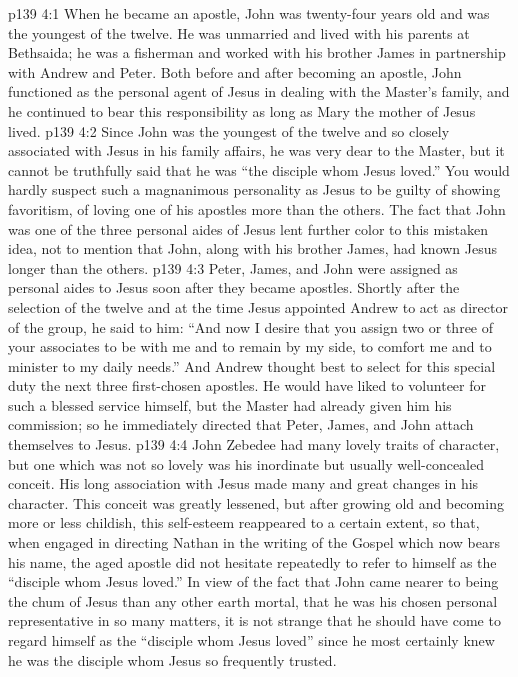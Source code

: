 \vs p139 4:1 When he became an apostle, John was twenty\hyp{}four years old and was the youngest of the twelve. He was unmarried and lived with his parents at Bethsaida; he was a fisherman and worked with his brother James in partnership with Andrew and Peter. Both before and after becoming an apostle, John functioned as the personal agent of Jesus in dealing with the Master’s family, and he continued to bear this responsibility as long as Mary the mother of Jesus lived.
\vs p139 4:2 Since John was the youngest of the twelve and so closely associated with Jesus in his family affairs, he was very dear to the Master, but it cannot be truthfully said that he was “the disciple whom Jesus loved.” You would hardly suspect such a magnanimous personality as Jesus to be guilty of showing favoritism, of loving one of his apostles more than the others. The fact that John was one of the three personal aides of Jesus lent further color to this mistaken idea, not to mention that John, along with his brother James, had known Jesus longer than the others.
\pc \vs p139 4:3 Peter, James, and John were assigned as personal aides to Jesus soon after they became apostles. Shortly after the selection of the twelve and at the time Jesus appointed Andrew to act as director of the group, he said to him: \textcolor{ubdarkred}{“And now I desire that you assign two or three of your associates to be with me and to remain by my side, to comfort me and to minister to my daily needs.”} And Andrew thought best to select for this special duty the next three first\hyp{}chosen apostles. He would have liked to volunteer for such a blessed service himself, but the Master had already given him his commission; so he immediately directed that Peter, James, and John attach themselves to Jesus.
\pc \vs p139 4:4 John Zebedee had many lovely traits of character, but one which was not so lovely was his inordinate but usually well\hyp{}concealed conceit. His long association with Jesus made many and great changes in his character. This conceit was greatly lessened, but after growing old and becoming more or less childish, this self\hyp{}esteem reappeared to a certain extent, so that, when engaged in directing Nathan in the writing of the Gospel which now bears his name, the aged apostle did not hesitate repeatedly to refer to himself as the “disciple whom Jesus loved.” In view of the fact that John came nearer to being the chum of Jesus than any other earth mortal, that he was his chosen personal representative in so many matters, it is not strange that he should have come to regard himself as the “disciple whom Jesus loved” since he most certainly knew he was the disciple whom Jesus so frequently trusted.
